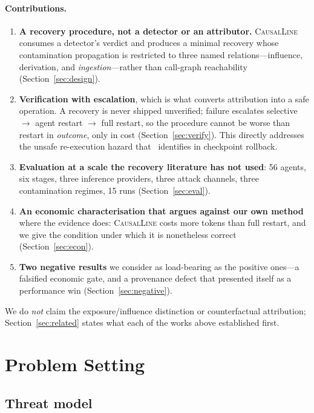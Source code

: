 \documentclass[10pt,twocolumn]{article}
\newcommand{\sys}{\textsc{CausalLine}}
\begin{document}
\paragraph{Contributions.}
\begin{enumerate}
\itemsep2pt
\item \textbf{A recovery procedure, not a detector or an attributor.} \sys{}
consumes a detector's verdict and produces a minimal recovery whose
contamination propagation is restricted to three named relations---influence,
derivation, and \emph{ingestion}---rather than call-graph reachability
(Section~\ref{sec:design}).
\item \textbf{Verification with escalation}, which is what converts
attribution into a safe operation. A recovery is never shipped unverified;
failure escalates selective $\rightarrow$ agent restart $\rightarrow$ full
restart, so the procedure cannot be worse than restart in \emph{outcome},
only in cost (Section~\ref{sec:verify}). This directly addresses the unsafe
re-execution hazard that~\cite{trustsurvey2026} identifies in checkpoint
rollback.
\item \textbf{Evaluation at a scale the recovery literature has not used}: 56
agents, six stages, three inference providers, three attack channels, three
contamination regimes, 15 runs (Section~\ref{sec:eval}).
\item \textbf{An economic characterisation that argues against our own
method} where the evidence does: \sys{} costs more tokens than full restart,
and we give the condition under which it is nonetheless correct
(Section~\ref{sec:econ}).
\item \textbf{Two negative results} we consider as load-bearing as the
positive ones---a falsified economic gate, and a provenance defect that
presented itself as a performance win (Section~\ref{sec:negative}).
\end{enumerate}

We do \emph{not} claim the exposure/influence distinction or counterfactual
attribution; Section~\ref{sec:related} states what each of the works above
established first.

\section{Problem Setting}

\subsection{Threat model}
\end{document}
